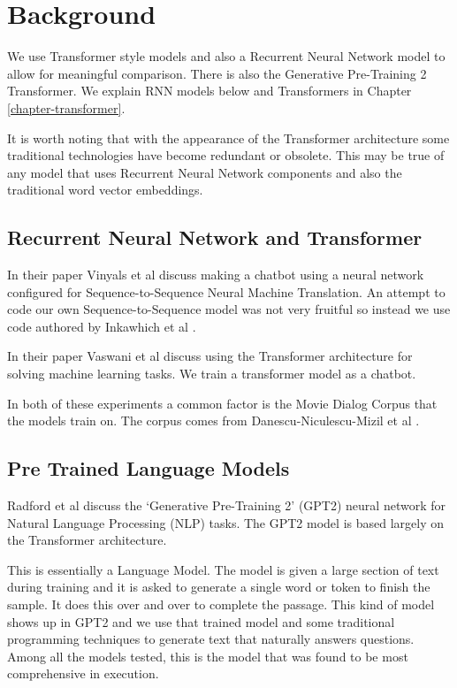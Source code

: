 \section{Background}
We use Transformer style models and also a Recurrent Neural Network model to allow for meaningful comparison. There is also the Generative Pre-Training 2 Transformer. We explain RNN models below and Transformers in Chapter \ref{chapter-transformer}.

It is worth noting that with the appearance of the Transformer architecture some traditional technologies have become redundant or obsolete. This may be true of any model that uses Recurrent Neural Network components and also the traditional word vector embeddings.

\subsection{Recurrent Neural Network and Transformer}

In their paper Vinyals et al \cite{DBLP:journals/corr/VinyalsL15} discuss making a chatbot using a neural network configured for Sequence-to-Sequence Neural Machine Translation. An attempt to code our own Sequence-to-Sequence model was not very fruitful so instead we use code authored by Inkawhich et al \cite{2018Inkawhich}.

In their paper Vaswani et al \cite{Vaswani2017AttentionIA} discuss using the Transformer architecture for solving machine learning tasks. We train a transformer model as a chatbot.

In both of these experiments a common factor is the Movie Dialog Corpus that the models train on. The corpus comes from Danescu-Niculescu-Mizil et al \cite{Danescu-Niculescu-Mizil+Lee:11a}.

\subsection{Pre Trained Language Models}
Radford et al \cite{radford2019language} discuss the `Generative Pre-Training 2' (GPT2) neural network for Natural Language Processing (\ac{NLP}) tasks. The GPT2 model is based largely on the Transformer architecture. 

This is essentially a Language Model. The model is given a large section of text during training and it is asked to generate a single word or token to finish the sample. It does this over and over to complete the passage. This kind of model shows up in GPT2 and we use that trained model and some traditional programming techniques to generate text that naturally answers questions. Among all the models tested, this is the model that was found to be most comprehensive in execution.

